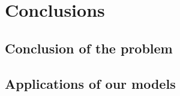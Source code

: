 \section{Conclusions}\label{sec:conclu}


\subsection{Conclusion of the problem}
\subsection{Applications of our models}
